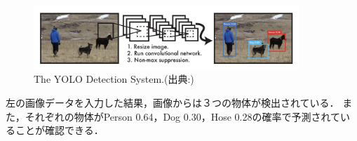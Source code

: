 \documentclass[../main]{subfiles}
\begin{document}
        \begin{figure}[H]
        \centering
        \includegraphics[width=10cm]{../images/yolo_exp.png}
        \caption{The YOLO Detection System.(出典:\cite{yolo_paper_v1})}
        \label{figure::yolo_exp}
        \end{figure}
        左の画像データを入力した結果，画像からは３つの物体が検出されている．
        また，それぞれの物体がPerson 0.64，Dog 0.30，Hose 0.28の確率で予測されていることが確認できる．
    
\end{document}
